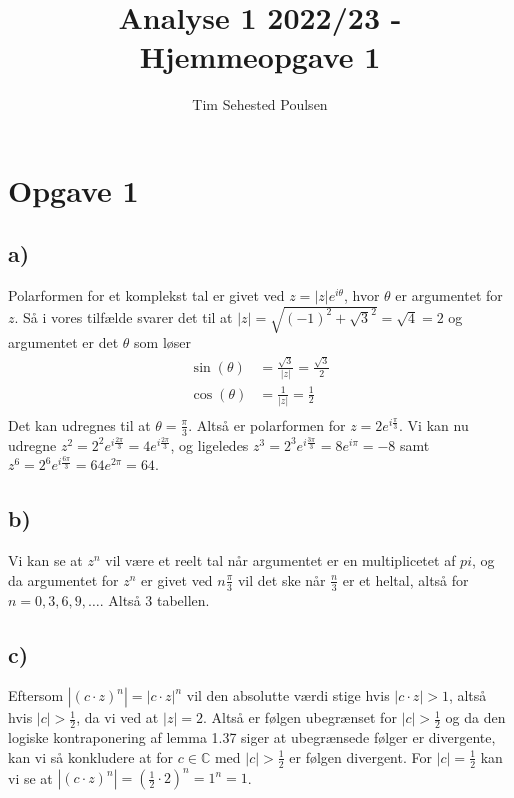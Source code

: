 \documentclass{article}
\title{Analyse 1 2022/23 - Hjemmeopgave 1}
\author{Tim Sehested Poulsen}
\newcommand{\m}[1]{\mathbb{#1}}
\newcommand{\mC}{\m{C}}
\begin{document}
\section*{Opgave 1}
\subsection*{a)}
Polarformen for et komplekst tal er givet ved $z = |z|e^{i\theta}$, hvor $\theta$ er argumentet for $z$.
Så i vores tilfælde svarer det til at $|z| = \sqrt{(-1)^2 + \sqrt{3}^2} = \sqrt{4}= 2$ og argumentet er det $\theta$ som løser
\begin{align*}
\sin(\theta) &= \frac{\sqrt{3}}{|z|} = \frac{\sqrt{3}}{2} \\
\cos(\theta) &= \frac{1}{|z|} = \frac{1}{2} \\
\end{align*}
Det kan udregnes til at $\theta = \frac{\pi}{3}$. Altså er polarformen for $z= 2e^{i\frac{\pi}{3}}$.
Vi kan nu udregne $z^2 = 2^2e^{i\frac{2\pi}{3}} = 4e^{i\frac{2\pi}{3}}$, og ligeledes
$z^3 = 2^3e^{i\frac{3\pi}{3}} = 8 e^{i\pi} = -8$ samt
$z^6 = 2^6e^{i\frac{6\pi}{3}} = 64 e^{2\pi} = 64$.
\subsection*{b)}
Vi kan se at $z^n$ vil være et reelt tal når argumentet er en multiplicetet af $pi$, og da argumentet for 
$z^n$ er givet ved $n\frac{\pi}{3}$ vil det ske når $\frac{n}{3}$ er et heltal, altså for $n=0,3,6,9,\dots$. Altså 3 tabellen.

\subsection*{c)}
Eftersom $|(c\cdot z)^n| = |c\cdot z|^n$ vil den absolutte værdi stige hvis $|c \cdot z| > 1$, altså hvis $|c| > \frac{1}{2}$, 
da vi ved at $|z| = 2$. Altså er følgen ubegrænset for $|c| > \frac{1}{2}$ og da den logiske kontraponering af lemma 1.37 siger at
ubegrænsede følger er divergente, kan vi så konkludere at for $c \in \mC$ med $|c| > \frac{1}{2}$ er følgen divergent.
For $|c| =\frac{1}{2}$ kan vi se at $|(c \cdot z)^n| = (\frac{1}{2} \cdot 2)^n = 1^n = 1$.
\end{document}
